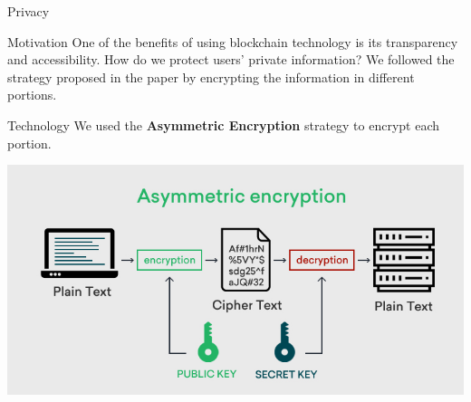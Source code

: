 \begin{frame}{Privacy}
    \begin{block}{Motivation}
        One of the benefits of using blockchain technology is its transparency and accessibility. How do we protect users' private information? We followed the strategy proposed in the paper by encrypting the information in different portions.
    \end{block}
    
    \begin{block}{Technology}
        We used the \textbf{Asymmetric Encryption} strategy to encrypt each portion.
    \end{block}
    
    \vspace{5pt}
    
    \centering
    \includegraphics[width=0.65\linewidth]{images/encryption.jpg}
\end{frame}

